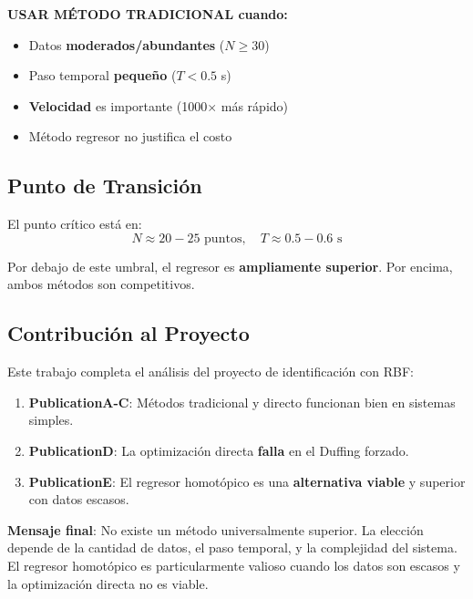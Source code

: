 \documentclass[11pt,a4paper]{article}
\begin{document}
\textbf{USAR MÉTODO TRADICIONAL cuando:}
\begin{itemize}
\item Datos \textbf{moderados/abundantes} ($N \geq 30$)
\item Paso temporal \textbf{pequeño} ($T < 0.5$ s)
\item \textbf{Velocidad} es importante (1000$\times$ más rápido)
\item Método regresor no justifica el costo
\end{itemize}

\subsection{Punto de Transición}

El punto crítico está en:
\begin{equation}
N \approx 20-25 \text{ puntos}, \quad T \approx 0.5-0.6 \text{ s}
\end{equation}

Por debajo de este umbral, el regresor es \textbf{ampliamente superior}. Por encima, ambos métodos son competitivos.

\subsection{Contribución al Proyecto}

Este trabajo completa el análisis del proyecto de identificación con RBF:

\begin{enumerate}
\item \textbf{PublicationA-C}: Métodos tradicional y directo funcionan bien en sistemas simples.
\item \textbf{PublicationD}: La optimización directa \textbf{falla} en el Duffing forzado.
\item \textbf{PublicationE}: El regresor homotópico es una \textbf{alternativa viable} y superior con datos escasos.
\end{enumerate}

\textbf{Mensaje final}: No existe un método universalmente superior. La elección depende de la cantidad de datos, el paso temporal, y la complejidad del sistema. El regresor homotópico es particularmente valioso cuando los datos son escasos y la optimización directa no es viable.
\end{document}
